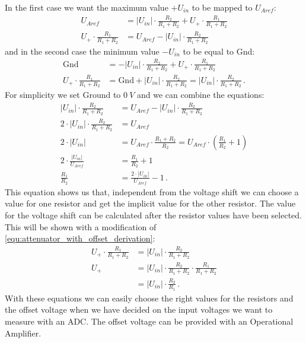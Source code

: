 In the first case we want the maximum value $+U_{in}$ to be mapped to $U_{Aref}$:
\begin{align}
	U_{Aref} &= \lvert U_{in} \rvert \cdot \frac{R_2}{R_1 + R_2} + U_+ \cdot \frac{R_1}{R_1 + R_2} \\
	U_+ \cdot \frac{R_1}{R_1 + R_2} &= U_{Aref} - \lvert U_{in} \rvert \cdot \frac{R_2}{R_1 + R_2}
\end{align}
and in the second case the minimum value $-U_{in}$ to be equal to Gnd:
\begin{align}
	\text{Gnd} &= - \lvert U_{in} \rvert \cdot \frac{R_2}{R_1 + R_2} + U_+ \cdot \frac{R_1}{R_1 + R_2} \\
	U_+ \cdot \frac{R_1}{R_1 + R_2} &= \text{Gnd} + \lvert U_{in} \rvert \cdot \frac{R_2}{R_1 + R_2} = \lvert U_{in} \rvert \cdot \frac{R_2}{R_1 + R_2}\,.
	\label{equ:attenuator_with_offset_derivation}
\end{align}
For simplicity we set Ground to $\SI{0}{V}$ and we can combine the equations:
\begin{align}
	\lvert U_{in} \rvert \cdot \frac{R_2}{R_1 + R_2} &= U_{Aref} - \lvert U_{in} \rvert \cdot \frac{R_2}{R_1 + R_2} \\
	2 \cdot \lvert U_{in} \rvert \cdot \frac{R_2}{R_1 + R_2} &= U_{Aref} \\
	2 \cdot \lvert U_{in} \rvert &= U_{Aref} \cdot \frac{R_1 + R_2}{R_2} = U_{Aref} \cdot \left( \frac{R_1}{R_2} + 1 \right) \\
	2 \cdot \frac{\lvert U_{in} \rvert}{U_{Aref}} &= \frac{R_1}{R_2} + 1 \\
	\frac{R_1}{R_2} &= \frac{2 \cdot \lvert U_{in} \rvert}{U_{Aref}} - 1\,.
\end{align}
This equation shows us that, independent from the voltage shift we can choose a value for one resistor and get the implicit value for the other resistor. The value for the voltage shift can be calculated after the resistor values have been selected. This will be shown with a modification of \cref{equ:attenuator_with_offset_derivation}:
\begin{align}
	U_+ \cdot \frac{R_1}{R_1 + R_2} &= \lvert U_{in} \rvert \cdot \frac{R_2}{R_1 + R_2} \\
	U_+ &= \lvert U_{in} \rvert \cdot \frac{R_2}{R_1 + R_2} \cdot \frac{R_1}{R_1 + R_2} \\
			&= \lvert U_{in} \rvert \cdot \frac{R_2}{R_1}\,.
\end{align}
With these equations we can easily choose the right values for the resistors and the offset voltage when we have decided on the input voltages we want to measure with an ADC. The offset voltage can be provided with an Operational Amplifier.


